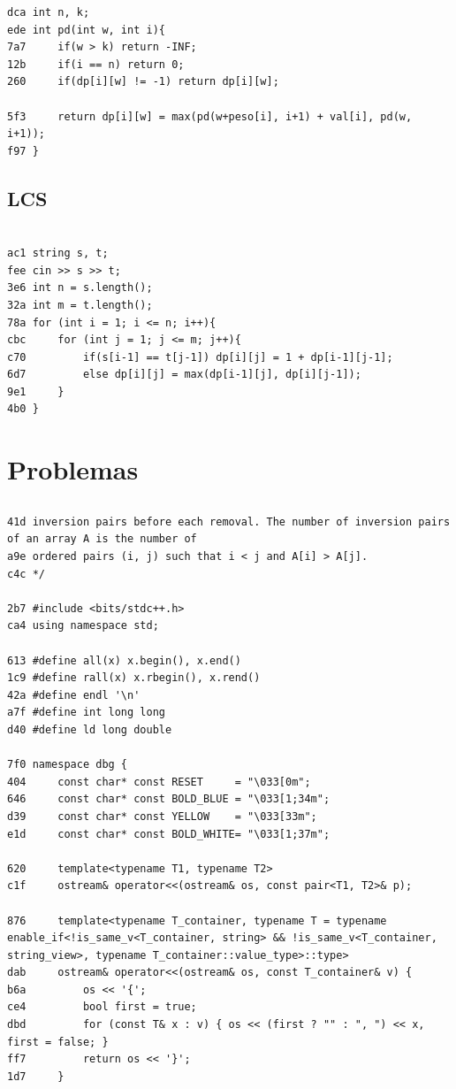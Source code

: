 \documentclass[11pt, a4paper, twoside]{article}
\begin{document}
{\begin{lstlisting}
dca int n, k;
ede int pd(int w, int i){
7a7     if(w > k) return -INF;
12b     if(i == n) return 0;
260     if(dp[i][w] != -1) return dp[i][w];
    
5f3     return dp[i][w] = max(pd(w+peso[i], i+1) + val[i], pd(w, i+1));
f97 }
\end{lstlisting}

\subsection{LCS}
\begin{lstlisting}

ac1 string s, t;
fee cin >> s >> t;
3e6 int n = s.length();
32a int m = t.length();
78a for (int i = 1; i <= n; i++){
cbc     for (int j = 1; j <= m; j++){
c70         if(s[i-1] == t[j-1]) dp[i][j] = 1 + dp[i-1][j-1];
6d7         else dp[i][j] = max(dp[i-1][j], dp[i][j-1]);
9e1     }
4b0 }
\end{lstlisting}



%
%

\section{Problemas}

\subsection{}
\begin{lstlisting}
41d inversion pairs before each removal. The number of inversion pairs of an array A is the number of
a9e ordered pairs (i, j) such that i < j and A[i] > A[j].
c4c */

2b7 #include <bits/stdc++.h>
ca4 using namespace std;

613 #define all(x) x.begin(), x.end()
1c9 #define rall(x) x.rbegin(), x.rend()
42a #define endl '\n'
a7f #define int long long
d40 #define ld long double

7f0 namespace dbg {
404     const char* const RESET     = "\033[0m";
646     const char* const BOLD_BLUE = "\033[1;34m";
d39     const char* const YELLOW    = "\033[33m";
e1d     const char* const BOLD_WHITE= "\033[1;37m";
    
620     template<typename T1, typename T2>
c1f     ostream& operator<<(ostream& os, const pair<T1, T2>& p);
    
876     template<typename T_container, typename T = typename enable_if<!is_same_v<T_container, string> && !is_same_v<T_container, string_view>, typename T_container::value_type>::type>
dab     ostream& operator<<(ostream& os, const T_container& v) {
b6a         os << '{';
ce4         bool first = true;
dbd         for (const T& x : v) { os << (first ? "" : ", ") << x, first = false; }
ff7         return os << '}';
1d7     }
    

\end{lstlisting}}
\end{document}
